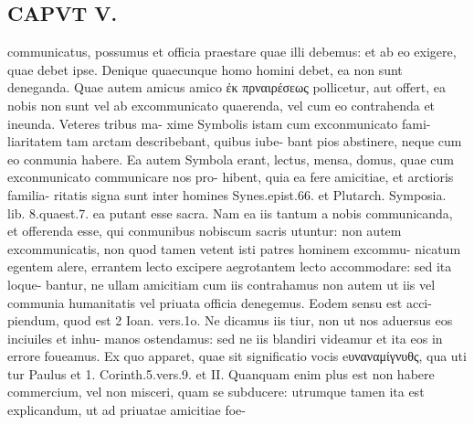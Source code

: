 \documentclass{article}
\begin{document}
\begin{pages}
\section*{CAPVT  V. }
\marginpar{[ p.405 ]}communicatus, possumus et officia praestare quae illi debemus: et ab eo exigere, quae debet ipse. Denique quaecunque homo homini debet, ea non sunt deneganda. Quae autem amicus amico ἐκ πρναιρέσεως pollicetur, aut offert, ea nobis non sunt vel ab excommunicato quaerenda, vel cum eo contrahenda et ineunda. Veteres tribus ma- xime Symbolis istam cum exconmunicato fami- liaritatem tam arctam describebant, quibus iube- bant pios abstinere, neque cum eo conmunia habere. Ea autem Symbola erant, lectus, mensa, domus, quae cum exconmunicato communicare nos pro- hibent, quia ea fere amicitiae, et arctioris familia- ritatis signa sunt inter homines Synes.epist.66. et Plutarch. Symposia. lib. 8.quaest.7. ea putant esse sacra. Nam ea iis tantum a nobis communicanda, et offerenda esse, qui conmunibus nobiscum sacris utuntur: non autem excommunicatis, non quod tamen vetent isti patres hominem excommu- nicatum egentem alere, errantem lecto excipere aegrotantem lecto accommodare: sed ita loque- bantur, ne ullam amicitiam cum iis contrahamus non autem ut iis vel communia humanitatis vel priuata officia denegemus. Eodem sensu est acci- piendum, quod est 2 Ioan. vers.1o. Ne dicamus iis tiur, non ut nos aduersus eos inciuiles et inhu- manos ostendamus: sed ne iis blandiri videamur et ita eos in errore foueamus. Ex quo apparet, quae sit significatio vocis eυναναμίγνυθς, qua uti tur Paulus et 1. Corinth.5.vers.9. et II. Quanquam enim plus est non habere commercium, vel non misceri, quam se subducere: utrumque tamen ita est explicandum, ut ad priuatae amicitiae foe- 

\end{pages}
\end{document}
